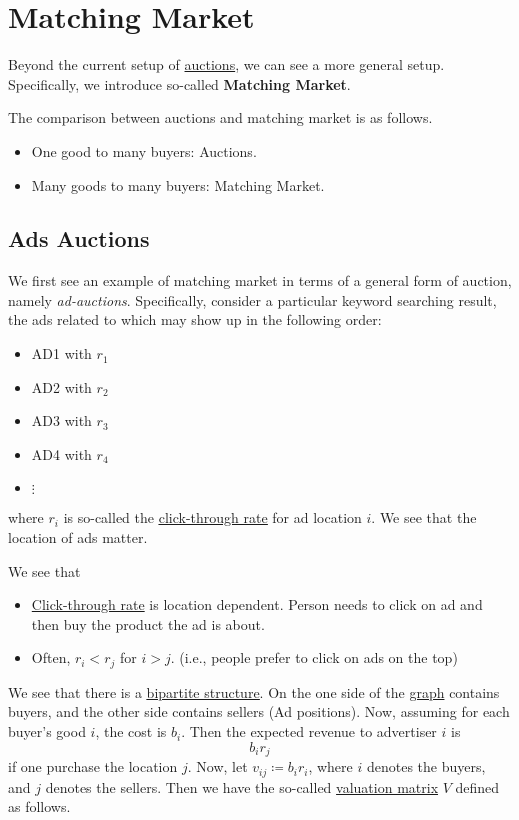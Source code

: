 \chapter{Matching Market}
Beyond the current setup of \hyperref[ch:auctions]{auctions}, we can see a more general setup. Specifically, we introduce so-called
\textbf{Matching Market}.

\begin{note}
	The comparison between auctions and matching market is as follows.
	\begin{itemize}
		\item One good to many buyers: Auctions.
		\item Many goods to many buyers: Matching Market.
	\end{itemize}
\end{note}

\section{Ads Auctions}
We first see an example of matching market in terms of a general form of auction, namely \emph{ad-auctions}. Specifically, consider a particular keyword searching result, the ads related to which may show up in the following order:
\begin{itemize}
	\item AD1 with \(r_1\)
	\item AD2 with \(r_2\)
	\item AD3 with \(r_3\)
	\item AD4 with \(r_4\)
	\item \(\vdots\)
\end{itemize}
where \(r_i\) is so-called the \href{https://en.wikipedia.org/wiki/Click-through_rate}{\underline{click-through rate}} for ad location \(i\). We see that the location of ads matter.

\begin{note}
	We see that
	\begin{itemize}
		\item \href{https://en.wikipedia.org/wiki/Click-through_rate}{Click-through rate} is location dependent. Person needs to click on ad and then buy the product the ad is about.
		\item Often, \(r_i < r_j\) for \(i > j\). (i.e., people prefer to click on ads on the top)
	\end{itemize}
\end{note}

We see that there is a \href{https://en.wikipedia.org/wiki/Bipartite_graph}{\underline{bipartite structure}}. On the one side of the \hyperref[def:graph]{graph} contains buyers, and the other side contains sellers (Ad positions). Now, assuming for each buyer's good \(i\), the cost is \(b_i\). Then the expected revenue to advertiser \(i\) is
\[
	b_i r_j
\]
if one purchase the location \(j\). Now, let \(v_{ij} \coloneqq b_{i}r_{i}\), where \(i\) denotes the buyers, and \(j\) denotes the sellers. Then we have the so-called \hyperref[def:valuation-matrix]{valuation matrix} \(V\) defined as follows.


